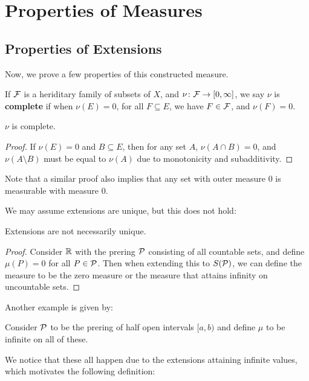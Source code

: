 \chapter{Properties of Measures}

\section{Properties of Extensions}
Now, we prove a few properties of this constructed measure.

\begin{definition}
    If $\mathcal F$ is a heriditary family of subsets of $X$, and $\nu \colon \mathcal F \to [0, \infty]$, we say $\nu$ is \textbf{complete} if when $\nu(E) = 0$, for all $F \subseteq E$, we have $F \in \mathcal F$, and $\nu(F) = 0$.
\end{definition}
\begin{proposition}
    $\nu$ is complete.
\end{proposition}

\begin{proof}
    If $\nu(E) = 0$ and $B \subseteq E$, then for any set $A$, $\nu(A \cap B) = 0$, and $\nu(A \setminus B)$  must be equal to $\nu(A)$ due to monotonicity and subadditivity.
\end{proof}

Note that a similar proof also implies that any set with outer measure $0$ is measurable with measure $0$.

We may assume extensions are unique, but this does not hold:

\begin{proposition}
    Extensions are not necessarily unique.
\end{proposition}

\begin{proof}
    Consider $\mathbb R$ with the prering $\mathcal P$ consisting of all countable sets, and define $\mu(P) = 0$ for all $P \in \mathcal P$. Then when extending this to $S(\mathcal P)$, we can define the measure to be the zero measure or the measure that attains infinity on uncountable sets.
\end{proof}

Another example is given by:

\begin{example}
    Consider $\mathcal P$ to be the prering of half open intervals $[a, b)$ and define $\mu$ to be infinite on all of these.    
\end{example}

We notice that these all happen due to the extensions attaining infinite values, which motivates the following definition:

